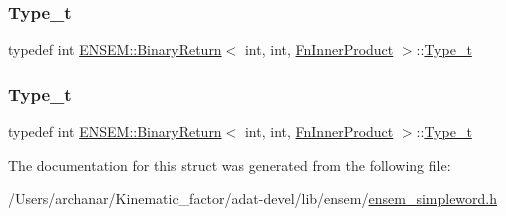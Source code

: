 \mbox{\label{structENSEM_1_1BinaryReturn_3_01int_00_01int_00_01FnInnerProduct_01_4_a702d8c8623acf6a0b21fd2fc27b4fa44}} 
\subsubsection{\texorpdfstring{Type\_t}{Type\_t}\hspace{0.1cm}{\footnotesize\ttfamily [2/3]}}
{\footnotesize\ttfamily typedef int \mbox{\hyperlink{structENSEM_1_1BinaryReturn}{E\+N\+S\+E\+M\+::\+Binary\+Return}}$<$ int, int, \mbox{\hyperlink{structENSEM_1_1FnInnerProduct}{Fn\+Inner\+Product}} $>$\+::\mbox{\hyperlink{structENSEM_1_1BinaryReturn_3_01int_00_01int_00_01FnInnerProduct_01_4_a702d8c8623acf6a0b21fd2fc27b4fa44}{Type\+\_\+t}}}

\mbox{\label{structENSEM_1_1BinaryReturn_3_01int_00_01int_00_01FnInnerProduct_01_4_a702d8c8623acf6a0b21fd2fc27b4fa44}} 
\subsubsection{\texorpdfstring{Type\_t}{Type\_t}\hspace{0.1cm}{\footnotesize\ttfamily [3/3]}}
{\footnotesize\ttfamily typedef int \mbox{\hyperlink{structENSEM_1_1BinaryReturn}{E\+N\+S\+E\+M\+::\+Binary\+Return}}$<$ int, int, \mbox{\hyperlink{structENSEM_1_1FnInnerProduct}{Fn\+Inner\+Product}} $>$\+::\mbox{\hyperlink{structENSEM_1_1BinaryReturn_3_01int_00_01int_00_01FnInnerProduct_01_4_a702d8c8623acf6a0b21fd2fc27b4fa44}{Type\+\_\+t}}}



The documentation for this struct was generated from the following file\+:\begin{DoxyCompactItemize}
\item 
/\+Users/archanar/\+Kinematic\+\_\+factor/adat-\/devel/lib/ensem/\mbox{\hyperlink{adat-devel_2lib_2ensem_2ensem__simpleword_8h}{ensem\+\_\+simpleword.\+h}}\end{DoxyCompactItemize}
